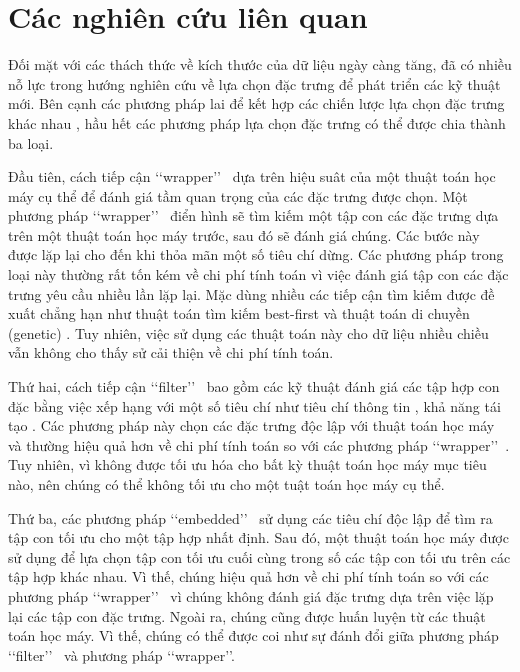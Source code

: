 \section{Các nghiên cứu liên quan}
Đối mặt với các thách thức về kích thước của dữ liệu ngày càng tăng, đã có nhiều nỗ lực trong hướng nghiên cứu về lựa chọn đặc trưng để phát triển các kỹ thuật mới. Bên cạnh các phương pháp lai để kết hợp các chiến lược lựa chọn đặc trưng khác nhau \cite{saeys2007review,ang2015supervised}, hầu hết các phương pháp lựa chọn đặc trưng có thể được chia thành ba loại.

Đầu tiên, cách tiếp cận \lq\lq wrapper\rq\rq~ dựa trên hiệu suât của một thuật toán học máy cụ thể để đánh giá tầm quan trọng của các đặc trưng được chọn. Một phương pháp \lq\lq wrapper\rq\rq~ điển hình sẽ tìm kiếm một tập con các đặc trưng dựa trên một thuật toán học máy trước, sau đó sẽ đánh giá chúng. Các bước này được lặp lại cho đến khi thỏa mãn một số tiêu chí dừng. Các phương pháp trong loại này thường rất tốn kém về chi phí tính toán vì việc đánh giá tập con các đặc trưng yêu cầu nhiều lần lặp lại. Mặc dùng nhiều các tiếp cận tìm kiếm được đề xuất chẳng hạn như thuật toán tìm kiếm best-first \cite{arai2016unsupervised} và thuật toán di chuyền (genetic) \cite{goldberg1988genetic}. Tuy nhiên, việc sử dụng các thuật toán này cho dữ liệu nhiều chiều vẫn không cho thấy sử cải thiện về chi phí tính toán.

Thứ hai, cách tiếp cận \lq\lq filter\rq\rq~ bao gồm các kỹ thuật đánh giá các tập hợp con đặc bằng việc xếp hạng với một số tiêu chí như tiêu chí thông tin \cite{nguyen2014efficiency, shishkin2016efficiency}, khả năng tái tạo \cite{farahat2011efficiency, masaeli2010convex}. Các phương pháp này chọn các đặc trưng độc lập với thuật toán học máy và thường hiệu quả hơn về chi phí tính toán so với các phương pháp \lq\lq wrapper\rq\rq~\cite{li2017feature}. Tuy nhiên, vì không được tối ưu hóa cho bất kỳ thuật toán học máy mục tiêu nào, nên chúng có thể không tối ưu cho một tuật toán học máy cụ thể.

Thứ ba, các phương pháp \lq\lq embedded\rq\rq~ sử dụng các tiêu chí độc lập để tìm ra tập con tối ưu cho một tập hợp nhất định. Sau đó, một thuật toán học máy được sử dụng để lựa chọn tập con tối ưu cuối cùng trong số các tập con tối ưu trên các tập hợp khác nhau. Vì thế, chúng hiệu quả hơn về chi phí tính toán so với các phương pháp \lq\lq wrapper\rq\rq~ vì chúng không đánh giá đặc trưng dựa trên việc lặp lại các tập con đặc trưng. Ngoài ra, chúng cũng được huấn luyện từ các thuật toán học máy. Vì thế, chúng có thể được coi như sự đánh đổi giữa phương pháp \lq\lq filter\rq\rq~ và phương pháp \lq\lq wrapper\rq\rq \cite{li2017feature}.

